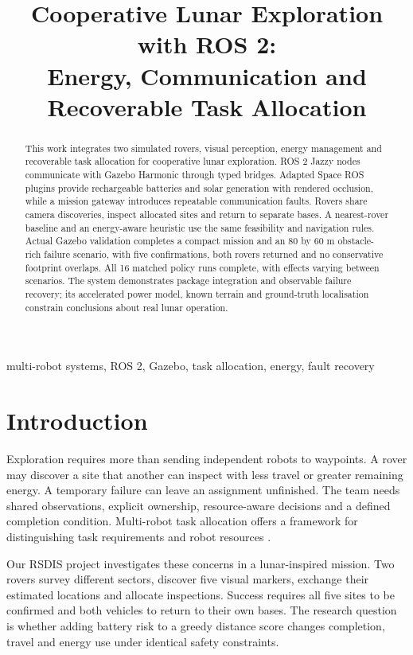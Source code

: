 \documentclass[conference]{IEEEtran}
\title{Cooperative Lunar Exploration with ROS 2:\\Energy, Communication and Recoverable Task Allocation}
\author{\IEEEauthorblockN{Henrique Correia}
\IEEEauthorblockA{Instituto Superior de\\Engenharia do Porto\\1221309}
\and \IEEEauthorblockN{Pedro Ribeiro}
\IEEEauthorblockA{Instituto Superior de\\Engenharia do Porto\\1231177}
\and \IEEEauthorblockN{Francisco Liquito}
\IEEEauthorblockA{Instituto Superior de\\Engenharia do Porto\\1231216}}
\begin{document}
\maketitle
\begin{abstract}
This work integrates two simulated rovers, visual perception, energy management
and recoverable task allocation for cooperative lunar exploration. ROS 2 Jazzy
nodes communicate with Gazebo Harmonic through typed bridges. Adapted Space ROS
plugins provide rechargeable batteries and solar generation with rendered
occlusion, while a mission gateway introduces repeatable communication faults.
Rovers share camera discoveries, inspect allocated sites and return to separate
bases. A nearest-rover baseline and an energy-aware heuristic use the same
feasibility and navigation rules. Actual Gazebo validation completes a compact
mission and an 80 by 60 m obstacle-rich failure scenario, with five confirmations,
both rovers returned and no conservative footprint overlaps. All 16 matched
policy runs complete, with effects varying between scenarios. The system
demonstrates package integration and observable failure recovery; its accelerated
power model, known terrain and ground-truth localisation constrain conclusions
about real lunar operation.
\end{abstract}
\begin{IEEEkeywords}
multi-robot systems, ROS 2, Gazebo, task allocation, energy, fault recovery
\end{IEEEkeywords}

\section{Introduction}
Exploration requires more than sending independent robots to waypoints. A rover
may discover a site that another can inspect with less travel or greater
remaining energy. A temporary failure can leave an assignment unfinished.
The team needs shared observations, explicit ownership, resource-aware
decisions and a defined completion condition. Multi-robot task allocation offers
a framework for distinguishing task requirements and robot resources
\cite{gerkey}.

Our RSDIS project investigates these concerns in a lunar-inspired mission.
Two rovers survey different sectors, discover five visual markers, exchange their
estimated locations and allocate inspections. Success requires all five
sites to be confirmed and both vehicles to return to their own bases. The
research question is whether adding battery risk to a greedy distance score
changes completion, travel and energy use under identical safety constraints.
\end{document}
